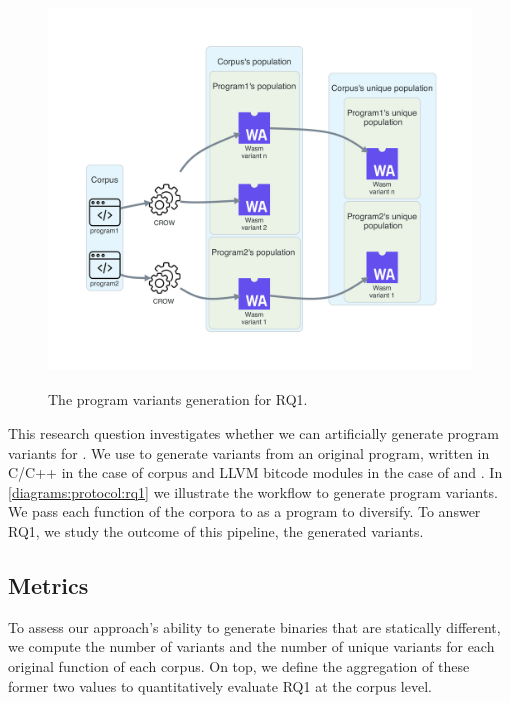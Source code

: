 
\section{\rqone}
\label{rq1:method}


\begin{figure}[h]
    \centering
    \includegraphics[height=4.1in]{diagrams/RQ1.pdf}
    \caption{The program variants generation for RQ1.}
    \label{diagrams:protocol:rq1}
\end{figure}


This research question investigates whether we can artificially generate program variants for \wasm. We use to generate variants from an original program, written in C/C++ in the case of \corpusrosetta corpus and LLVM bitcode modules in the case of \corpussodium and \corpusqrcode. 
In \autoref{diagrams:protocol:rq1} we illustrate the workflow to generate \wasm program variants. We pass each function of the corpora to as a program to diversify. To answer RQ1, we study the outcome of this pipeline, the generated \wasm variants. 


\subsection*{Metrics}

To assess our approach's ability to generate \wasm binaries that are statically different, we compute the number of variants and the number of unique variants for each original function of each corpus. 
On top, we define the aggregation of these former two values to quantitatively evaluate RQ1 at the corpus level. 

